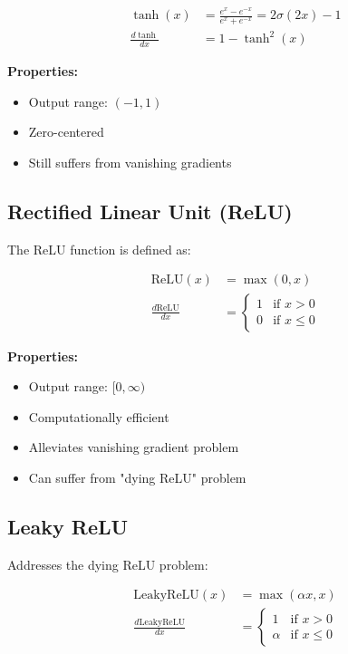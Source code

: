 \documentclass{article}
\begin{document}
\begin{align}
\tanh(x) &= \frac{e^x - e^{-x}}{e^x + e^{-x}} = 2\sigma(2x) - 1 \\
\frac{d\tanh}{dx} &= 1 - \tanh^2(x)
\end{align}

\textbf{Properties:}
\begin{itemize}
    \item Output range: $(-1, 1)$
    \item Zero-centered
    \item Still suffers from vanishing gradients
\end{itemize}

\subsection{Rectified Linear Unit (ReLU)}

The ReLU function is defined as:

\begin{align}
\text{ReLU}(x) &= \max(0, x) \\
\frac{d\text{ReLU}}{dx} &= \begin{cases} 
1 & \text{if } x > 0 \\
0 & \text{if } x \leq 0
\end{cases}
\end{align}

\textbf{Properties:}
\begin{itemize}
    \item Output range: $[0, \infty)$
    \item Computationally efficient
    \item Alleviates vanishing gradient problem
    \item Can suffer from "dying ReLU" problem
\end{itemize}

\subsection{Leaky ReLU}

Addresses the dying ReLU problem:

\begin{align}
\text{LeakyReLU}(x) &= \max(\alpha x, x) \\
\frac{d\text{LeakyReLU}}{dx} &= \begin{cases} 
1 & \text{if } x > 0 \\
\alpha & \text{if } x \leq 0
\end{cases}
\end{align}
\end{document}
